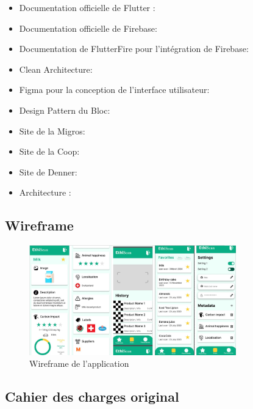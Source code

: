 \begin{itemize}[noitemsep]
    \item Documentation officielle de Flutter : \cite{flutterDocs}
    \item Documentation officielle de Firebase: \cite{firebaseDocs}
    \item Documentation de FlutterFire pour l'intégration de Firebase: \cite{flutterFireDocs}
    \item Clean Architecture: \cite{cleanArchitecture}
    \item Figma pour la conception de l'interface utilisateur: \cite{figma}
    \item Design Pattern du Bloc: \cite{blocPattern}
    \item Site de la Migros: \cite{migros}
    \item Site de la Coop: \cite{coop}
    \item Site de Denner: \cite{denner}
    \item Architecture : \cite{googleCloudArchitecture}
\end{itemize}


\subsection{Wireframe}
\label{doc:wireframe}

\begin{figure}[H]
    \centering
    \includegraphics[width=0.8\textwidth]{images/wireframe.png}
    \caption{Wireframe de l'application}
    \label{doc:wireframe}
\end{figure}

\subsection{Cahier des charges original}

